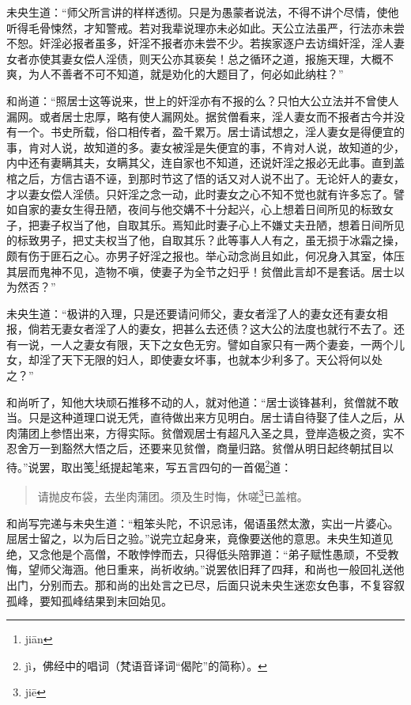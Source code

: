 \documentclass[a4paper,12pt,UTF8,twoside]{ctexbook}
\begin{document}
未央生道：“师父所言讲的样样透彻。只是为愚蒙者说法，不得不讲个尽情，使他听得毛骨悚然，才知警戒。若对我辈说理亦未必如此。天公立法虽严，行法亦未尝不恕。奸淫必报者虽多，奸淫不报者亦未尝不少。若挨家逐户去访缉奸淫，淫人妻女者亦使其妻女偿人淫债，则天公亦其亵矣！总之循环之道，报施天理，大概不爽，为人不善者不可不知道，就是劝化的大题目了，何必如此纳柱？”

和尚道：“照居士这等说来，世上的奸淫亦有不报的么？只怕大公立法并不曾使人漏网。或者居士忠厚，略有使人漏网处。据贫僧看来，淫人妻女而不报者古今并没有一个。书史所载，俗口相传者，盈千累万。居士请试想之，淫人妻女是得便宜的事，肯对人说，故知道的多。妻女被淫是失便宜的事，不肯对人说，故知道的少，内中还有妻瞒其夫，女瞒其父，连自家也不知道，还说奸淫之报必无此事。直到盖棺之后，方信古语不诬，到那时节这了悟的话又对人说不出了。无论奸人的妻女，才以妻女偿人淫债。只奸淫之念一动，此时妻女之心不知不觉也就有许多忘了。譬如自家的妻女生得丑陋，夜间与他交媾不十分起兴，心上想着日间所见的标致女子，把妻子权当了他，自取其乐。焉知此时妻子心上不嫌丈夫丑陋，想着日间所见的标致男子，把丈夫权当了他，自取其乐？此等事人人有之，虽无损于冰霜之操，颇有伤于匪石之心。亦男子好淫之报也。举心动念尚且如此，何况身入其室，体压其层而鬼神不见，造物不嗔，使妻子为全节之妇乎！贫僧此言却不是套话。居士以为然否？”

未央生道：“极讲的入理，只是还要请问师父，妻女者淫了人的妻女还有妻女相报，倘若无妻女者淫了人的妻女，把甚么去还债？这大公的法度也就行不去了。还有一说，一人之妻女有限，天下之女色无穷。譬如自家只有一两个妻妾，一两个儿女，却淫了天下无限的妇人，即使妻女坏事，也就本少利多了。天公将何以处之？”

和尚听了，知他大块顽石推移不动的人，就对他道：“居士谈锋甚利，贫僧就不敢当。只是这种道理口说无凭，直待做出来方见明白。居士请自待娶了佳人之后，从肉蒲团上参悟出来，方得实际。贫僧观居士有超凡入圣之具，登岸造极之资，实不忍舍万一到豁然大悟之后，还要来见贫僧，商量归路。贫僧从明日起终朝拭目以待。”说罢，取出笺\footnote{ji\=an}纸提起笔来，写五言四句的一首偈\footnote{j\`i，佛经中的唱词（梵语音译词“偈陀”的简称）。}道：

\begin{quotation}
请抛皮布袋，去坐肉蒲团。须及生时悔，休嗟\footnote{ji\=e}已盖棺。
\end{quotation}

和尚写完递与未央生道：“粗笨头陀，不识忌讳，偈语虽然太激，实出一片婆心。屈居士留之，以为后日之验。”说完立起身来，竟像要送他的意思。未央生知道见绝，又念他是个高僧，不敢悖悖而去，只得低头陪罪道：“弟子赋性愚顽，不受教悔，望师父海涵。他日重来，尚祈收纳。”说罢依旧拜了四拜，和尚也一般回礼送他出门，分别而去。那和尚的出处言之已尽，后面只说未央生迷恋女色事，不复容叙孤峰，要知孤峰结果到末回始见。
\end{document}
